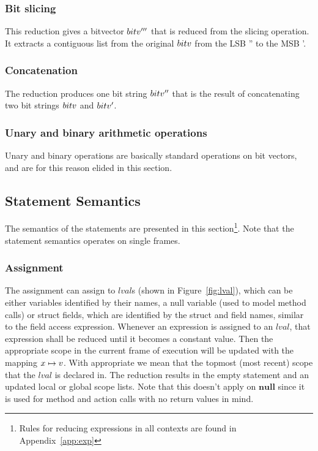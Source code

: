 \documentclass[UTF8]{article}
\begin{document}
\subsubsection*{Bit slicing}
This reduction gives a bitvector $bitv'''$ that is reduced from the slicing operation. It extracts a contiguous list from the original $bitv$ from the LSB \bitv'' to the MSB \bitv'.

\begin{figure}[ht!]
    \ottusedrule{\ottdruleeXXsliceXXv{}}
\end{figure}




\subsubsection*{Concatenation}
The reduction produces one bit string $bitv''$ that is the result of concatenating two bit strings $bitv$ and $bitv'$.

\begin{figure}[ht!]
    \ottusedrule{\ottdruleeXXconcatXXv{}}
\end{figure}




\subsubsection*{Unary and binary arithmetic operations}
Unary and binary operations are basically standard operations on bit vectors, and are for this reason elided in this section.



\subsection{Statement Semantics}
The semantics of the statements are presented in this section\footnote{Rules for reducing expressions in all contexts are found in Appendix~\ref{app:exp}}. Note that the statement semantics operates on single frames.


\subsubsection*{Assignment}
The assignment can assign to $lval$s (shown in Figure~\ref{fig:lval}), which can be either variables identified by their names, a null variable (used to model method calls) or struct fields, which are identified by the struct and field names, similar to the field access expression. Whenever an expression is assigned to an $lval$, that expression shall be reduced until it becomes a constant value. Then the appropriate scope in the current frame of execution will be updated with the mapping  $x \mapsto v$. With appropriate we mean that the topmost (most recent) scope that the $lval$ is declared in. The reduction results in the empty statement and an updated local or global scope lists. Note that this doesn't apply on $\mathbf{null}$ since it is used for method and action calls with no return values in mind.
\end{document}
